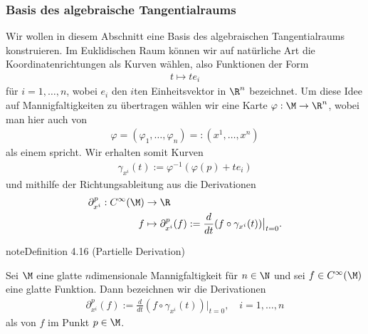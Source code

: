 \documentclass[letterpaper,10pt,german]{jupyterBook}
\begin{document}
\subsubsection{Basis des algebraische Tangentialraums}
\label{\detokenize{manifolds/tangential:basis-des-algebraische-tangentialraums}}\label{\detokenize{manifolds/tangential:sec-tpbasis}}
\sphinxAtStartPar
Wir wollen in diesem Abschnitt eine Basis des algebraischen Tangentialraums konstruieren.
Im Euklidischen Raum können wir auf natürliche Art die Koordinatenrichtungen als Kurven wählen, also Funktionen der Form
\begin{equation*}
\begin{split}t \mapsto t e_i\end{split}
\end{equation*}
\sphinxAtStartPar
für \(i=1,\ldots,n\), wobei \(e_i\) den \(i\)\sphinxhyphen{}ten Einheitsvektor in \(\R^n\) bezeichnet.
Um diese Idee auf Mannigfaltigkeiten zu übertragen wählen wir eine Karte \(\varphi:\M\to\R^n\), wobei man hier auch von
\begin{equation*}
\begin{split}\varphi = (\varphi_1,\ldots,\varphi_n) =: (x^1,\ldots,x^n)\end{split}
\end{equation*}
\sphinxAtStartPar
als einem  spricht.
Wir erhalten somit Kurven
\begin{equation*}
\begin{split}\gamma_{x^i}(t):= \varphi^{-1}(\varphi(p) + t e_i)\end{split}
\end{equation*}
\sphinxAtStartPar
und mithilfe der Richtungsableitung aus {\hyperref[\detokenize{manifolds/tangential:def:direcdiv}]{}} die Derivationen
\begin{equation*}
\begin{split}\partial_{x^i}^p: C^\infty(\M) &\to \R\\
f &\mapsto \partial_{x^i}^p(f) := \frac{d}{dt} (f\circ \gamma_{x^i}(t))\big\rvert_{t=0}.\end{split}
\end{equation*}\label{manifolds/tangential:definition-12}
\begin{sphinxadmonition}{note}{Definition 4.16 (Partielle Derivation)}



\sphinxAtStartPar
Sei \(\M\) eine glatte \(n\)\sphinxhyphen{}dimensionale Mannigfaltigkeit für \(n\in\N\) und sei \(f \in C^\infty(\M)\) eine glatte Funktion.
Dann bezeichnen wir die Derivationen
\begin{equation*}
\begin{split}\partial_{x^i}^p (f) := \frac{d}{dt} (f\circ \gamma_{x^i}(t))\big\rvert_{t=0}, \quad i=1,\ldots,n\end{split}
\end{equation*}
\sphinxAtStartPar
als  von \(f\) im Punkt \(p \in \M\).
\end{sphinxadmonition}
\end{document}

